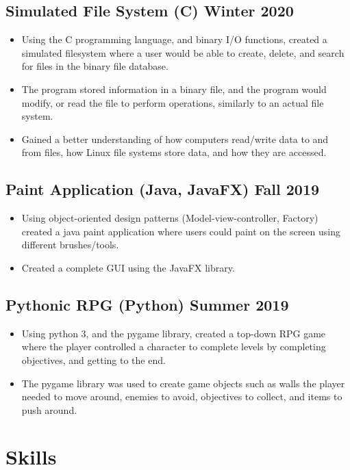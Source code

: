 \documentclass[10pt]{article}
\begin{document}
\subsection{Simulated File System (C) \hfill Winter 2020}
\begin{itemize}
  \item Using the C programming language, and binary I/O functions, created a simulated filesystem where a user would be able to create, delete, and search for files in the binary file database.
  \item The program stored information in a binary file, and the program would modify, or read the file to perform operations, similarly to an actual file system.
  \item Gained a better understanding of how computers read/write data to and from files, how Linux file systems store data, and how they are accessed.
\end{itemize}

\subsection{Paint Application (Java, JavaFX) \hfill Fall 2019}
\begin{itemize}
  \item Using object-oriented design patterns (Model-view-controller, Factory) created a java paint application where users could paint on the screen using different brushes/tools.
  \item Created a complete GUI using the JavaFX library.
\end{itemize}

\subsection{Pythonic RPG (Python) \hfill Summer 2019}
\begin{itemize}
  \item Using python 3, and the pygame library, created a top-down RPG game where the player controlled a character to complete levels by completing objectives, and getting to the end.
  \item The pygame library was used to create game objects such as walls the player needed to move around, enemies to avoid, objectives to collect, and items to push around.
\end{itemize}


\section{Skills}
\end{document}
